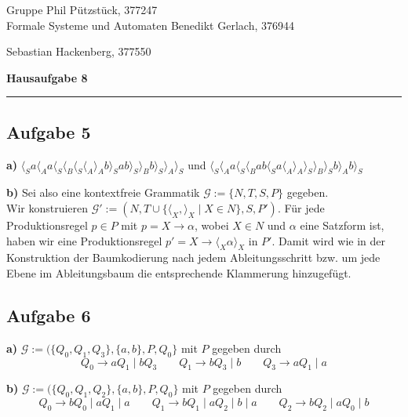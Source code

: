 \documentclass[a4paper,graphics,11pt]{article}
\newcommand{\aufgabe}[1]{\subsection*{Aufgabe #1}}
\begin{document}
\noindent Gruppe              \hfill Phil Pützstück, 377247\\
\noindent Formale Systeme und Automaten \hfill Benedikt Gerlach, 376944\\
\strut\hfill Sebastian Hackenberg, 377550\\
\begin{center}
	\LARGE{\textbf{Hausaufgabe 8}}
\end{center}
\begin{center}
\rule[0.1ex]{\textwidth}{1pt}
\end{center}

\aufgabe{5}
\textbf{a)}
$
\langle_S
    a
    \langle_A
        a
        \langle_S
            \langle_B
                \langle_S
                    \langle_A
                    \rangle_A
                    b
                \rangle_S
                a
                b
                \rangle_S
            \rangle_B
        b
        \rangle_S
    \rangle_A
\rangle_S
$
und
$
\langle_S
    \langle_A
        a
        \langle_S
            \langle_B
                a
                b
                \langle_S
                    a
                    \langle_A
                    \rangle_A
                \rangle_S
            \rangle_B
        \rangle_S
        b
    \rangle_A
    b
\rangle_S
$

\textbf{b)}
Sei also eine kontextfreie Grammatik $\mathcal{G} := \{N, T, S, P\}$ gegeben.\\
Wir konstruieren
$\mathcal{G}' := (N, T \cup \{\langle_X, \rangle_X \mid X \in N\}, S, P')$.
Für jede Produktionsregel $p \in P$ mit $p = X\to \alpha$,
wobei $X \in N$ und $\alpha$ eine Satzform ist, haben wir eine Produktionsregel
$p' = X \to \langle_X \alpha \rangle_X$ in $P'$. Damit wird wie in der Konstruktion
der Baumkodierung nach jedem Ableitungsschritt bzw. um jede Ebene im Ableitungsbaum
die entsprechende Klammerung hinzugefügt.

\aufgabe{6}
\textbf{a)}
$\mathcal{G} := (\{Q_0, Q_1, Q_3\}, \{a,b\}, P, Q_0\}$ mit $P$ gegeben durch
$$
    Q_0 \to aQ_1 \mid bQ_3
    \qquad
    Q_1 \to bQ_3 \mid b
    \qquad
    Q_3 \to aQ_1 \mid a
$$

\textbf{b)}
$\mathcal{G} := (\{Q_0, Q_1, Q_2\}, \{a,b\}, P, Q_0\}$ mit $P$ gegeben durch
$$
    Q_0 \to bQ_0 \mid aQ_1 \mid a
    \qquad
    Q_1 \to bQ_1 \mid aQ_2 \mid b \mid a
    \qquad
    Q_2 \to bQ_2 \mid aQ_0 \mid b
$$
\end{document}
